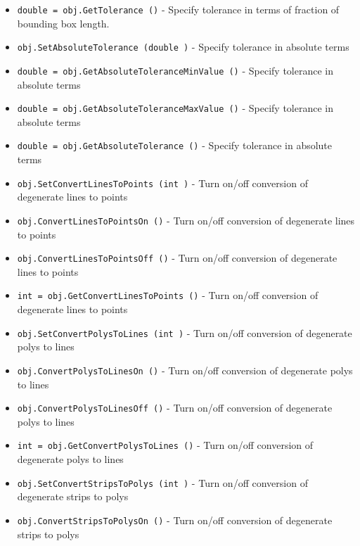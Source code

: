 \begin{itemize}
\item  \verb|double = obj.GetTolerance ()| -  Specify tolerance in terms of fraction of bounding box length.

\item  \verb|obj.SetAbsoluteTolerance (double )| -  Specify tolerance in absolute terms

\item  \verb|double = obj.GetAbsoluteToleranceMinValue ()| -  Specify tolerance in absolute terms

\item  \verb|double = obj.GetAbsoluteToleranceMaxValue ()| -  Specify tolerance in absolute terms

\item  \verb|double = obj.GetAbsoluteTolerance ()| -  Specify tolerance in absolute terms

\item  \verb|obj.SetConvertLinesToPoints (int )| -  Turn on/off conversion of degenerate lines to points

\item  \verb|obj.ConvertLinesToPointsOn ()| -  Turn on/off conversion of degenerate lines to points

\item  \verb|obj.ConvertLinesToPointsOff ()| -  Turn on/off conversion of degenerate lines to points

\item  \verb|int = obj.GetConvertLinesToPoints ()| -  Turn on/off conversion of degenerate lines to points

\item  \verb|obj.SetConvertPolysToLines (int )| -  Turn on/off conversion of degenerate polys to lines

\item  \verb|obj.ConvertPolysToLinesOn ()| -  Turn on/off conversion of degenerate polys to lines

\item  \verb|obj.ConvertPolysToLinesOff ()| -  Turn on/off conversion of degenerate polys to lines

\item  \verb|int = obj.GetConvertPolysToLines ()| -  Turn on/off conversion of degenerate polys to lines

\item  \verb|obj.SetConvertStripsToPolys (int )| -  Turn on/off conversion of degenerate strips to polys

\item  \verb|obj.ConvertStripsToPolysOn ()| -  Turn on/off conversion of degenerate strips to polys


\end{itemize}
